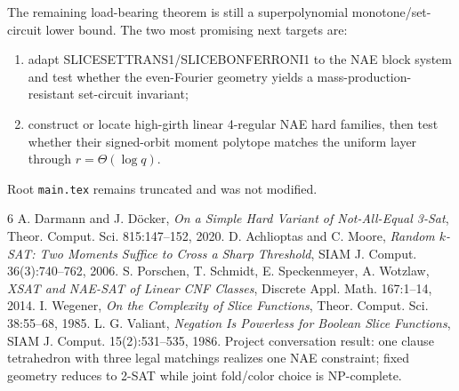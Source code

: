 \documentclass[11pt]{article}
\begin{document}
The remaining load-bearing theorem is still a superpolynomial monotone/set-circuit lower bound. The two most promising next targets are:
\begin{enumerate}
\item adapt SLICESETTRANS1/SLICEBONFERRONI1 to the NAE block system and test whether the even-Fourier geometry yields a mass-production-resistant set-circuit invariant;
\item construct or locate high-girth linear 4-regular NAE hard families, then test whether their signed-orbit moment polytope matches the uniform layer through $r=\Theta(\log q)$.
\end{enumerate}

Root \texttt{main.tex} remains truncated and was not modified.

\begin{thebibliography}{6}
 A. Darmann and J. D\"ocker, \emph{On a Simple Hard Variant of Not-All-Equal 3-Sat}, Theor. Comput. Sci. 815:147--152, 2020.
 D. Achlioptas and C. Moore, \emph{Random $k$-SAT: Two Moments Suffice to Cross a Sharp Threshold}, SIAM J. Comput. 36(3):740--762, 2006.
 S. Porschen, T. Schmidt, E. Speckenmeyer, A. Wotzlaw, \emph{XSAT and NAE-SAT of Linear CNF Classes}, Discrete Appl. Math. 167:1--14, 2014.
 I. Wegener, \emph{On the Complexity of Slice Functions}, Theor. Comput. Sci. 38:55--68, 1985.
 L. G. Valiant, \emph{Negation Is Powerless for Boolean Slice Functions}, SIAM J. Comput. 15(2):531--535, 1986.
 Project conversation result: one clause tetrahedron with three legal matchings realizes one NAE constraint; fixed geometry reduces to 2-SAT while joint fold/color choice is NP-complete.
\end{thebibliography}
\end{document}
